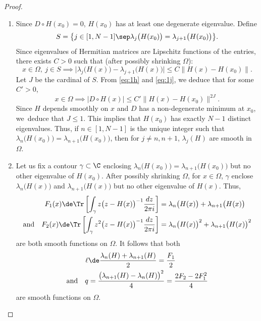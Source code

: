 \begin{proof}
\begin{enumerate}
\item
Since $D \circ H(x_0) = 0$, $H(x_0)$ has at least one degenerate eigenvalue. Define\vspace*{-3pt}
\begin{equation*}
S = \bigl\{ j \in [1,N-1]\sep \lambda_j\bigl( H(x_0) \bigr) = \lambda_{j+1}\bigl( H(x_0) \bigr) \bigr\}.
\end{equation*}
Since eigenvalues of Hermitian matrices are Lipschitz functions of the entries, there exists $C > 0$ such that (after possibly shrinking $\Omega$):
\begin{equation}\label{eq:1j}
x\in \Omega, \ j \in S \implies
\big|\lambda_j \bigl( H(x) \bigr) - \lambda_{j+1} \bigl( H(x) \bigr)\big| \leq C \big\| H(x)-H(x_0)\big\|.
\end{equation}
Let $J$ be the cardinal of $S$. From \eqref{eq:1h} and \eqref{eq:1j}, we deduce that for some $C' > 0$,\vspace*{-3pt}
\begin{equation*}
x\in \Omega \implies \big| D \circ H(x) \big| \leq C' \big\| H(x)-H(x_0)\big\|^{2J}.
\end{equation*}
Since $H$ depends smoothly on $x$ and $D$ has a non-degenerate minimum at $x_0$, we~deduce that $J \leq 1$. This implies that $H(x_0)$ has exactly $N-1$ distinct eigenvalues. Thus, if $n \in [1,N-1]$ is the unique integer such that $\lambda_n\bigl( H(x_0) \bigr) = \lambda_{n+1}\bigl( H(x_0)\bigr)$, then for $j \neq n, n+1$, $\lambda_j(H)$ are smooth in $\Omega$.

\item
Let us fix a contour $\gamma \subset \C$ enclosing $\lambda_n\bigl(H(x_0)\bigr) = \lambda_{n+1}\bigl(H(x_0)\bigr)$ but no other eigenvalue of $H(x_0)$. After possibly shrinking $\Omega$, for $x \in \Omega$, $\gamma$ enclose $\lambda_n\bigl(H(x)\bigr)$ and $\lambda_{n+1}\bigl(H(x)\bigr)$ but no other eigenvalue of $H(x)$. Thus,\vspace*{-3pt}
\begin{equation}\label{eq:0a}
\begin{split}
F_1(x) \de \Tr \left[ \int_\gamma z \bigl(z-H(x)\bigr)^{-1} \dfrac{dz}{2\pi i} \right] &= \lambda_n\bigl(H(x)\bigr) + \lambda_{n+1}\bigl(H(x)\bigr)
\\
\text{and} \quad F_2(x) \de \Tr \left[ \int_\gamma z^2 \bigl(z-H(x)\bigr)^{-1} \dfrac{dz}{2\pi i} \right] &= \lambda_n\bigl(H(x)\bigr)^2 + \lambda_{n+1}\bigl(H(x)\bigr)^2
\end{split}
\end{equation}
are both smooth functions on $\Omega$. It follows that both
\begin{equation}\label{eq:1m}
\begin{split}
\ell &\de \dfrac{\lambda_n(H) + \lambda_{n+1}(H)}{2} = \dfrac{F_1}{2} \\
\text{and} \quad q &= \dfrac{\bigl(\lambda_{n+1}(H) - \lambda_n(H)\bigr)^2}{4} = \dfrac{2F_2-2F_1^2}{4}
\end{split}
\end{equation}
are smooth functions on $\Omega$.


\end{enumerate}
\end{proof}
